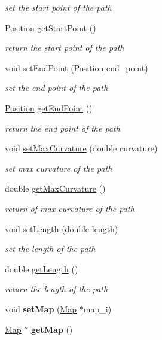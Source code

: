 \begin{DoxyCompactItemize}
\begin{DoxyCompactList}\small\item\em set the start point of the path \end{DoxyCompactList}\item 
\mbox{\hyperlink{class_position}{Position}} \mbox{\hyperlink{class_path_a88e537e6bfe6140d00b0f36ca642a4cd}{get\+Start\+Point}} ()
\begin{DoxyCompactList}\small\item\em return the start point of the path \end{DoxyCompactList}\item 
void \mbox{\hyperlink{class_path_a168f515818fd9b26a6264fdf95af52e8}{set\+End\+Point}} (\mbox{\hyperlink{class_position}{Position}} end\+\_\+point)
\begin{DoxyCompactList}\small\item\em set the end point of the path \end{DoxyCompactList}\item 
\mbox{\hyperlink{class_position}{Position}} \mbox{\hyperlink{class_path_ac2617080c944b93f7c0c63f3e59aa88c}{get\+End\+Point}} ()
\begin{DoxyCompactList}\small\item\em return the end point of the path \end{DoxyCompactList}\item 
void \mbox{\hyperlink{class_path_a132d54dc6350d1c2eb86611db60df7ff}{set\+Max\+Curvature}} (double curvature)
\begin{DoxyCompactList}\small\item\em set max curvature of the path \end{DoxyCompactList}\item 
double \mbox{\hyperlink{class_path_a613552d171c766462f422593b4957ecc}{get\+Max\+Curvature}} ()
\begin{DoxyCompactList}\small\item\em return of max curvature of the path \end{DoxyCompactList}\item 
void \mbox{\hyperlink{class_path_ad723ba990a07d7542703770a09df52a7}{set\+Length}} (double length)
\begin{DoxyCompactList}\small\item\em set the length of the path \end{DoxyCompactList}\item 
double \mbox{\hyperlink{class_path_ad497d2a12a47bc52a316da83dbe6acbc}{get\+Length}} ()
\begin{DoxyCompactList}\small\item\em return the length of the path \end{DoxyCompactList}\item 
\mbox{\label{class_path_a68a50ad6f0fd39d0b272bcb62655b475}} 
void {\bfseries set\+Map} (\mbox{\hyperlink{class_map}{Map}} $\ast$map\+\_\+i)
\item 
\mbox{\label{class_path_abacf46c32c4f36a79c2faf21a9a01270}} 
\mbox{\hyperlink{class_map}{Map}} $\ast$ {\bfseries get\+Map} ()
\end{DoxyCompactItemize}
